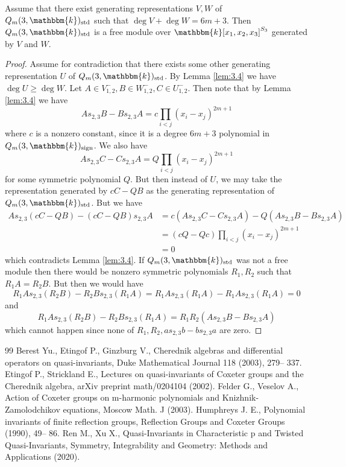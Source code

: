 \documentclass[11pt]{article}
\numberwithin{equation}{section}
\theoremstyle{definition}
\numberwithin{equation}{section}
\renewcommand{\k}{\mathbbm{k}}
\newcommand{\sgn}{\mathrm{sign}}
\newcommand{\std}{\mathrm{std}}
\begin{document}
\begin{lemma}\label{lem:3.5}
    Assume that there exist generating representations $V,W$ of $Q_m(3,\k)_\std$ such that $\deg V+\deg W=6m+3$. Then $Q_m(3,\k)_\std$ is a free module over $\k[x_1,x_2,x_3]^{S_3}$ generated by $V$ and $W$.
\end{lemma}
\begin{proof}
    Assume for contradiction that there exists some other generating representation $U$ of \linebreak
    $Q_m(3,\k)_\std$. By Lemma \ref{lem:3.4} we have $\deg U\geq \deg W$. Let $A\in V_{1,2}^-,B\in W_{1,2}^-,C\in U_{1,2}^-$. Then note that by Lemma \ref{lem:3.4} we have
    $$As_{2,3}B-Bs_{2,3}A=c\prod_{i<j}(x_i-x_j)^{2m+1}$$ 
    where $c$ is a nonzero constant, since it is a degree $6m+3$ polynomial in $Q_m(3,\k)_\sgn$. We also have
    $$As_{2,3}C-Cs_{2,3}A=Q\prod_{i<j}(x_i-x_j)^{2m+1}$$
    for some symmetric polynomial $Q$. But then instead of $U$, we may take the representation generated by $cC-QB$ as the generating representation of $Q_m(3,\k)_\std$. But we have
    \begin{align*}
        As_{2,3}(cC-QB)-(cC-QB)s_{2,3}A&=c(As_{2,3}C-Cs_{2,3}A)-Q(As_{2,3}B-Bs_{2,3}A)\\
        &=(cQ-Qc)\prod_{i<j}(x_i-x_j)^{2m+1}\\
        &=0
    \end{align*}
    which contradicts Lemma \ref{lem:3.4}. If $Q_m(3,\k)_\std$ was not a free module then there would be nonzero symmetric polynomials $R_1,R_2$ such that $R_1A=R_2B$. But then we would have 
    $$R_1As_{2,3}(R_2B)-R_2Bs_{2,3}(R_1A)=R_1As_{2,3}(R_1A)-R_1As_{2,3}(R_1A)=0$$
    and 
    $$R_1As_{2,3}(R_2B)-R_2Bs_{2,3}(R_1A)=R_1R_2(As_{2,3}B-Bs_{2,3}A)$$
    which cannot happen since none of $R_1,R_2,as_{2,3}b-bs_{2,3}a$ are zero.
\end{proof}
\begin{thebibliography}{99}
 Berest Yu., Etingof P., Ginzburg V., Cherednik algebras and differential operators on quasi-invariants, Duke Mathematical Journal 118 (2003), 279-- 337.
 Etingof P., Strickland E., Lectures on quasi-invariants of Coxeter groups and the Cherednik algebra, arXiv preprint math/0204104 (2002).
 Felder G., Veselov A., Action of Coxeter groups on m-harmonic polynomials and Knizhnik-Zamolodchikov equations, Moscow Math. J (2003).
 Humphreys J.  E., Polynomial invariants of finite reflection groups, Reflection Groups and Coxeter Groups (1990), 49-- 86.
 Ren M., Xu X., Quasi-Invariants in Characteristic p and Twisted Quasi-Invariants, Symmetry, Integrability and Geometry: Methods and Applications (2020).
\end{thebibliography}
\end{document}
